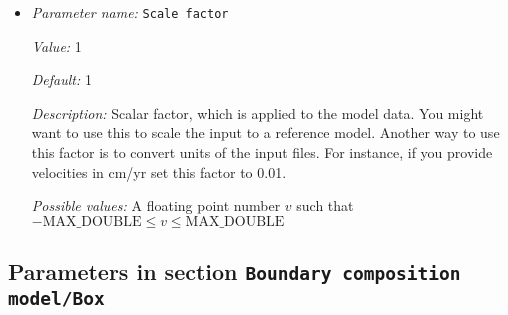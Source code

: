 \begin{itemize}
{\it Value:} 0


{\it Default:} 0


{\it Description:} Number of the first velocity file to be loaded when the model time is larger than `First velocity file model time'.


{\it Possible values:} An integer $n$ such that $-2147483648\leq n \leq 2147483647$
\item {\it Parameter name:} {\tt Scale factor}
\label{parameters:Boundary composition model/Ascii data model/Scale factor}
\label{parameters:Boundary_20composition_20model/Ascii_20data_20model/Scale_20factor}


{\it Value:} 1


{\it Default:} 1


{\it Description:} Scalar factor, which is applied to the model data. You might want to use this to scale the input to a reference model. Another way to use this factor is to convert units of the input files. For instance, if you provide velocities in cm/yr set this factor to 0.01.


{\it Possible values:} A floating point number $v$ such that $-\text{MAX\_DOUBLE} \leq v \leq \text{MAX\_DOUBLE}$
\end{itemize}

\subsection{Parameters in section \tt Boundary composition model/Box}
\label{parameters:Boundary_20composition_20model/Box}


